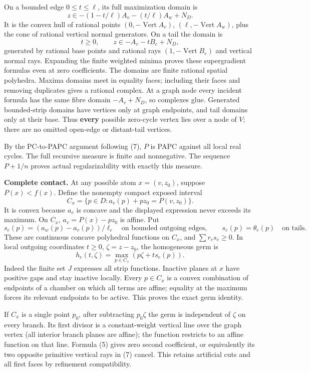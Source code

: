 \documentclass[
  11pt,
]{article}
\begin{document}
On a bounded edge \(0\leq t\leq\ell\), its full maximization domain is
\[
 z\in-(1-t/\ell)A_v-(t/\ell)A_w+N_D.                       \tag{21}
\] It is the convex hull of rational points
\((0,-\operatorname{Vert}A_v)\), \((\ell,-\operatorname{Vert}A_w)\),
plus the cone of rational vertical normal generators. On a tail the
domain is \[
 t\geq0,\qquad z\in-A_v-tB_e+N_D,                         \tag{22}
\] generated by rational base points and rational rays
\((1,-\operatorname{Vert}B_e)\) and vertical normal rays. Expanding the
finite weighted minima proves these supergradient formulas even at zero
coefficients. The domains are finite rational spatial polyhedra. Maxima
domains meet in equality faces; including their faces and removing
duplicates gives a rational complex. At a graph node every incident
formula has the same fibre domain \(-A_v+N_D\), so complexes glue.
Generated bounded-strip domains have vertices only at graph endpoints,
and tail domains only at their base. Thus \textbf{every} possible
zero-cycle vertex lies over a node of \(V\); there are no omitted
open-edge or distant-tail vertices.

By the PC-to-PAPC argument following (7), \(P\) is PAPC against all
local real cycles. The full recursive measure is finite and nonnegative.
The sequence \(P+1/n\) proves actual regularizability with exactly this
measure.

\textbf{Complete contact.} At any possible atom \(x=(v,z_0)\), suppose
\(P(x)<f(x)\). Define the nonempty compact exposed interval \[
 C_x=\{p\in D:a_v(p)+pz_0=P(v,z_0)\}.                      \tag{23}
\] It is convex because \(a_v\) is concave and the displayed expression
never exceeds its maximum. On \(C_x\), \(a_v=P(x)-pz_0\) is affine. Put
\[
 s_e(p)=(a_w(p)-a_v(p))/\ell_e\quad\text{on bounded outgoing edges},
 \qquad s_e(p)=\theta_e(p)\quad\text{on tails}.              \tag{24}
\] These are continuous concave polyhedral functions on \(C_x\), and
\(\sum r_es_e\geq0\). In local outgoing coordinates \(t\geq0\),
\(\zeta=z-z_0\), the homogeneous germ is \[
                            h_e(t,\zeta)=\max_{p\in C_x}(p\zeta+ts_e(p)).\tag{25}
\] Indeed the finite set \(J\) expresses all strip functions. Inactive
planes at \(x\) have positive gaps and stay inactive locally. Every
\(p\in C_x\) is a convex combination of endpoints of a chamber on which
all terms are affine; equality at the maximum forces its relevant
endpoints to be active. This proves the exact germ identity.

If \(C_x\) is a single point \(p_0\), after subtracting \(p_0\zeta\) the
germ is independent of \(\zeta\) on every branch. Its first divisor is a
constant-weight vertical line over the graph vertex (all interior branch
planes are affine); the function restricts to an affine function on that
line. Formula (5) gives zero second coefficient, or equivalently its two
opposite primitive vertical rays in (7) cancel. This retains artificial
cuts and all first faces by refinement compatibility.
\end{document}
